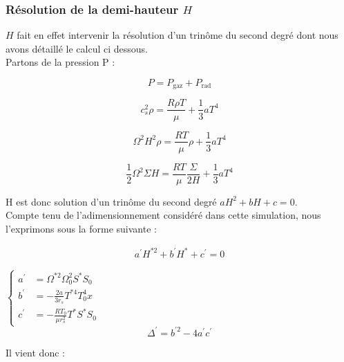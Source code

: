 \subsubsection{Résolution de la demi-hauteur $H$}
\label{ssec::resolution_H}

  $H$ fait en effet intervenir la résolution d'un trinôme du second degré dont nous avons détaillé le calcul ci dessous. \\

Partons de la pression P : 

\begin{equation}
	P = P_\textrm{gaz} + P_\textrm{rad}
\end{equation}


\begin{equation}
	c_{s}^{2} \rho = \frac{R \rho T}{\mu} + \frac{1}{3} a T^{4}
\end{equation}


\begin{equation}
	\Omega^{2} H^{2} \rho = \frac{R T}{\mu} \rho + \frac{1}{3} a T^{4}
\end{equation}


\begin{equation}
	\frac{1}{2} \Omega^{2} \Sigma H = \frac{R T}{\mu} \frac{\Sigma}{2 H} + \frac{1}{3} a T^{4}
\end{equation}

H est donc solution d'un trinôme du second degré $ a H^{2} + b H + c = 0$. \\
Compte tenu de l'adimensionnement considéré dans cette simulation, nous l'exprimons sous la forme suivante :  

\begin{eqnarray}
  a^{\prime} H^{* 2}+b^{\prime}H^{*}+c^{\prime}=0
  \end{eqnarray}

$\begin{cases}  
      a^{\prime} &= \Omega^{*2} \Omega_{0}^{2} S^{*} S_{0}\\
      b^{\prime} &= - \frac{2 a}{3 r_{s}} T^{*4} T_{0}^{4} x \\
      c^{\prime}&=-\frac{RT_{0}}{\mu r_{s}^{2}} T^{*} S^{*} S_{0}
     \end{cases}$ \\


\begin{equation}
	\Delta^{\prime} = b^{\prime 2} - 4a^{\prime}c^{\prime}
\end{equation} 

Il vient donc : 

